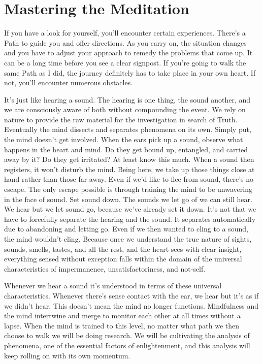 \section*{Mastering the Meditation}

If you have a look for yourself, you'll encounter certain experiences. There's a Path to guide you and offer directions. As you carry on, the situation changes and you have to adjust your approach to remedy the problems that come up. It can be a long time before you see a clear signpost. If you're going to walk the same Path as I did, the journey definitely has to take place in your own heart. If not, you'll encounter numerous obstacles.

It's just like hearing a sound. The hearing is one thing, the sound another, and we are consciously aware of both without compounding the event. We rely on nature to provide the raw material for the investigation in search of Truth. Eventually the mind dissects and separates phenomena on its own. Simply put, the mind doesn't get involved. When the ears pick up a sound, observe what happens in the heart and mind. Do they get bound up, entangled, and carried away by it? Do they get irritated? At least know this much. When a sound then registers, it won't disturb the mind. Being here, we take up those things close at hand rather than those far away. Even if we'd like to flee from sound, there's no escape. The only escape possible is through training the mind to be unwavering in the face of sound. Set sound down. The sounds we let go of we can still hear. We hear but we let sound go, because we've already set it down. It's not that we have to forcefully separate the hearing and the sound. It separates automatically due to abandoning and letting go. Even if we then wanted to cling to a sound, the mind wouldn't cling. Because once we understand the true nature of sights, sounds, smells, tastes, and all the rest, and the heart sees with clear insight, everything sensed without exception falls within the domain of the universal characteristics of impermanence, unsatisfactoriness, and not-self.

Whenever we hear a sound it's understood in terms of these universal characteristics. Whenever there's sense contact with the ear, we hear but it's as if we didn't hear. This doesn't mean the mind no longer functions. Mindfulness and the mind intertwine and merge to monitor each other at all times without a lapse. When the mind is trained to this level, no matter what path we then choose to walk we will be doing research. We will be cultivating the analysis of phenomena, one of the essential factors of enlightenment, and this analysis will keep rolling on with its own momentum.

